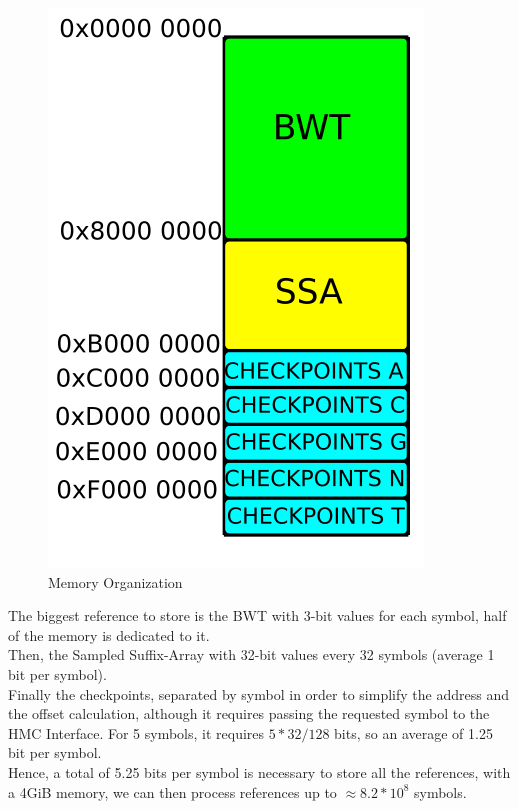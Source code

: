 \begin{minipage}[t]{0.4\textwidth}
\begin{figure}[H]
    \centering
    \hspace*{-10mm}\includegraphics[scale = 0.4]{Figures/MEM_RPZ.png}
    \caption{Memory Organization}
    \label{fig:memory}
\end{figure}
\end{minipage}
\hfill
\begin{minipage}[t]{0.5\textwidth}

The biggest reference to store is the BWT with 3-bit values for each symbol, half of the memory is dedicated to it. \\
Then, the Sampled Suffix-Array with 32-bit values every 32 symbols (average 1 bit per symbol). \\
Finally the checkpoints, separated by symbol in order to simplify the address and the offset calculation, although it requires passing the requested symbol to the HMC Interface. For 5 symbols, it requires $5 * 32 / 128$ bits, so an average of 1.25 bit per symbol.\\
Hence, a total of 5.25 bits per symbol is necessary to store all the references, with a 4GiB memory, we can then process references up to $\approx 8.2*10^{8}$ symbols.
\end{minipage}

